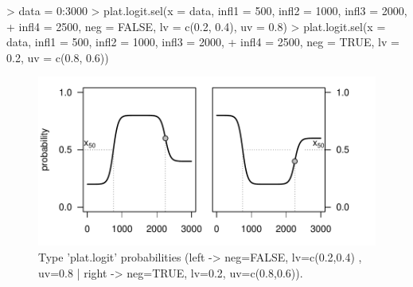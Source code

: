 \documentclass[letterpaper, 12pt]{article}
\begin{document}
\begin{Schunk}
\begin{Sinput}
> data = 0:3000
> plat.logit.sel(x = data, infl1 = 500, infl2 = 1000, infl3 = 2000, 
+     infl4 = 2500, neg = FALSE, lv = c(0.2, 0.4), uv = 0.8)
> plat.logit.sel(x = data, infl1 = 500, infl2 = 1000, infl3 = 2000, 
+     infl4 = 2500, neg = TRUE, lv = 0.2, uv = c(0.8, 0.6))
\end{Sinput}
\end{Schunk}
\begin{figure}[h]
\vspace{-20pt}
\begin{center}
\includegraphics{relation_sel-033}
\end{center}
\vspace{-30pt}
\caption{Type 'plat.logit' probabilities (left -> neg=FALSE, lv=c(0.2,0.4) , uv=0.8 | right -> neg=TRUE, lv=0.2, uv=c(0.8,0.6)).}
\vspace{-10pt}
\label{fig16}
\end{figure}







        
        
\end{document}

